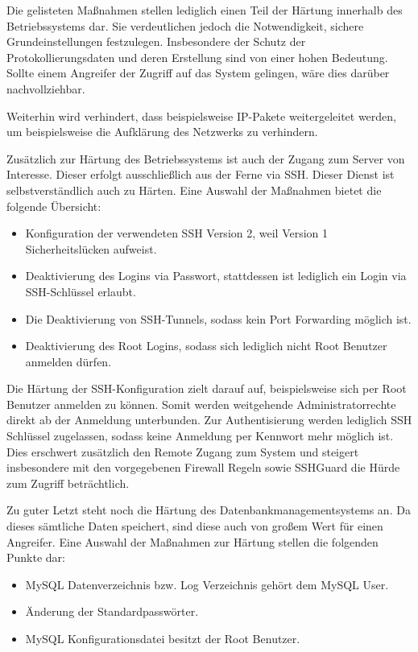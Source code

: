 Die gelisteten Maßnahmen stellen lediglich einen Teil der Härtung innerhalb des Betriebssystems dar. Sie verdeutlichen jedoch die Notwendigkeit, sichere Grundeinstellungen festzulegen. Insbesondere der Schutz der Protokollierungsdaten und deren Erstellung sind von einer hohen Bedeutung. Sollte einem Angreifer der Zugriff auf das System gelingen, wäre dies darüber nachvollziehbar.

Weiterhin wird verhindert, dass beispielsweise \ac{IP}-Pakete weitergeleitet werden, um beispielsweise die Aufklärung des Netzwerks zu verhindern.

Zusätzlich zur Härtung des Betriebssystems ist auch der Zugang zum Server von Interesse. Dieser erfolgt ausschließlich aus der Ferne via \ac{SSH}. Dieser Dienst ist selbstverständlich auch zu Härten. Eine Auswahl der Maßnahmen bietet die folgende Übersicht:

\begin{itemize}
	\item Konfiguration der verwendeten SSH Version 2, weil Version 1 Sicherheitslücken aufweist.
	\item Deaktivierung des Logins via Passwort, stattdessen ist lediglich ein Login via SSH-Schlüssel erlaubt.
	\item Die Deaktivierung von SSH-Tunnels, sodass kein Port Forwarding möglich ist.
	\item Deaktivierung des Root Logins, sodass sich lediglich nicht Root Benutzer anmelden dürfen.
\end{itemize}

Die Härtung der SSH-Konfiguration zielt darauf auf, beispielsweise sich per Root Benutzer anmelden zu können. Somit werden weitgehende Administratorrechte direkt ab der Anmeldung unterbunden. Zur Authentisierung werden lediglich \ac{SSH} Schlüssel zugelassen, sodass keine Anmeldung per Kennwort mehr möglich ist. Dies erschwert zusätzlich den Remote Zugang zum System und steigert insbesondere mit den vorgegebenen Firewall Regeln sowie SSHGuard die Hürde zum Zugriff beträchtlich.

Zu guter Letzt steht noch die Härtung des Datenbankmanagementsystems an. Da dieses sämtliche Daten speichert, sind diese auch von großem Wert für einen Angreifer. Eine Auswahl der Maßnahmen zur Härtung stellen die folgenden Punkte dar:

\begin{itemize}
	\item MySQL Datenverzeichnis bzw. Log Verzeichnis gehört dem MySQL User.
	\item Änderung der Standardpasswörter.
	\item MySQL Konfigurationsdatei besitzt der Root Benutzer.
\end{itemize}


